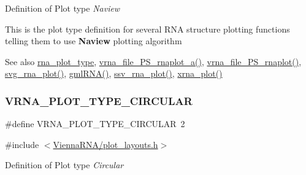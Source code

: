 Definition of Plot type {\itshape Naview} 

This is the plot type definition for several R\+NA structure plotting functions telling them to use {\bfseries Naview} plotting algorithm

\begin{DoxySeeAlso}{See also}
\mbox{\hyperlink{group__plotting__utils_ga5964c4581431b098b80027d6e14dcdd4}{rna\+\_\+plot\+\_\+type}}, \mbox{\hyperlink{plot__structure_8h_a139a31dd0ba9fc6612431f67de901c31}{vrna\+\_\+file\+\_\+\+P\+S\+\_\+rnaplot\+\_\+a()}}, \mbox{\hyperlink{plot__structure_8h_abdc8f6548ba4a3bc3cd868ccbcfdb86a}{vrna\+\_\+file\+\_\+\+P\+S\+\_\+rnaplot()}}, \mbox{\hyperlink{plot__structure_8h_ae7853539b5df98f294b4af434e979304}{svg\+\_\+rna\+\_\+plot()}}, \mbox{\hyperlink{plot__structure_8h_a70834bc8c0aad4fe6824ff76ccb8f329}{gml\+R\+N\+A()}}, \mbox{\hyperlink{plot__structure_8h_add368528755f9a830727b680243541df}{ssv\+\_\+rna\+\_\+plot()}}, \mbox{\hyperlink{plot__structure_8h_a2f6d5953e6a323df898896b8d6614483}{xrna\+\_\+plot()}} 
\end{DoxySeeAlso}
\mbox{\label{group__plotting__utils_ga8c9eac631348da92136c8363ecdd9fb9}} 
\subsubsection{\texorpdfstring{V\+R\+N\+A\+\_\+\+P\+L\+O\+T\+\_\+\+T\+Y\+P\+E\+\_\+\+C\+I\+R\+C\+U\+L\+AR}{VRNA\_PLOT\_TYPE\_CIRCULAR}}
{\footnotesize\ttfamily \#define V\+R\+N\+A\+\_\+\+P\+L\+O\+T\+\_\+\+T\+Y\+P\+E\+\_\+\+C\+I\+R\+C\+U\+L\+AR~2}



{\ttfamily \#include $<$\mbox{\hyperlink{plot__layouts_8h}{Vienna\+R\+N\+A/plot\+\_\+layouts.\+h}}$>$}



Definition of Plot type {\itshape Circular} 

